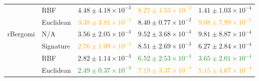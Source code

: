 \begin{table}[t]
{\begin{tabular}{llrrr}
 & RBF & $4.48 \pm 4.18 \times 10^{-3}$ & \textcolor{Orange}{\textbf{$8.27 \pm 1.53 \times 10^{-2}$}} & $1.41 \pm 1.03 \times 10^{-4}$ \\

 & Euclidean & \textcolor{Orange}{\textbf{$3.38 \pm 3.81 \times 10^{-3}$}} & $8.40 \pm 0.77 \times 10^{-2}$ & \textcolor{Orange}{\textbf{$9.08 \pm 7.99 \times 10^{-5}$}} \\
\midrule
\multirow{4}{*}{rBergomi}
 & N/A & $3.56 \pm 2.05 \times 10^{-3}$ & $9.52 \pm 3.68 \times 10^{-3}$ & $9.81 \pm 8.87 \times 10^{-4}$ \\

 & Signature & \textcolor{Orange}{\textbf{$2.76 \pm 1.09 \times 10^{-3}$}} & $8.51 \pm 2.69 \times 10^{-3}$ & $6.27 \pm 2.84 \times 10^{-4}$ \\

 & RBF & $2.82 \pm 1.14 \times 10^{-3}$ & \textcolor{ForestGreen}{\textbf{$6.52 \pm 2.53 \times 10^{-3}$}} & \textcolor{ForestGreen}{\textbf{$3.65 \pm 2.01 \times 10^{-4}$}} \\

 & Euclidean & \textcolor{ForestGreen}{\textbf{$2.49 \pm 0.37 \times 10^{-3}$}} & \textcolor{Orange}{\textbf{$7.19 \pm 3.37 \times 10^{-3}$}} & \textcolor{Orange}{\textbf{$5.15 \pm 4.67 \times 10^{-4}$}} \\
\bottomrule
\end{tabular}
} %
\end{table}